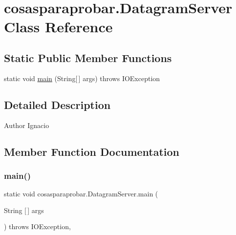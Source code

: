 \hypertarget{classcosasparaprobar_1_1_datagram_server}{}\section{cosasparaprobar.\+Datagram\+Server Class Reference}
\label{classcosasparaprobar_1_1_datagram_server}
\subsection*{Static Public Member Functions}
\begin{DoxyCompactItemize}
\item 
static void \mbox{\hyperlink{classcosasparaprobar_1_1_datagram_server_adc5bebf5f9dc06c39412c2218d9c6d84}{main}} (String\mbox{[}$\,$\mbox{]} args)  throws I\+O\+Exception     
\end{DoxyCompactItemize}


\subsection{Detailed Description}
\begin{DoxyAuthor}{Author}
Ignacio 
\end{DoxyAuthor}


\subsection{Member Function Documentation}
\mbox{\label{classcosasparaprobar_1_1_datagram_server_adc5bebf5f9dc06c39412c2218d9c6d84}} 
\subsubsection{\texorpdfstring{main()}{main()}}
{\footnotesize\ttfamily static void cosasparaprobar.\+Datagram\+Server.\+main (\begin{DoxyParamCaption}\item[{String \mbox{[}$\,$\mbox{]}}]{args }\end{DoxyParamCaption}) throws I\+O\+Exception\hspace{0.3cm}{\ttfamily [inline]}, {\ttfamily [static]}}


